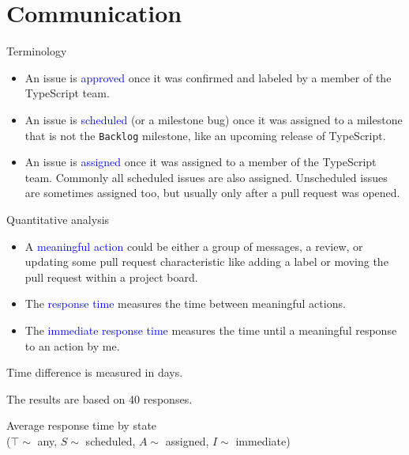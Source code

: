\documentclass{beamer}
\theoremstyle{definition}
\def\code#1{\texttt{\frenchspacing#1}}
\def\padding{\vspace{0.5cm}}
\def\b{\textcolor{blue}}
\begin{document}
\section{Communication}
\begin{frame}{Terminology}\pause
\begin{itemize}
    \item An issue is \b{approved} once it was confirmed and labeled by a member of the TypeScript team.\pause
    \item An issue is \b{scheduled} (or a milestone bug) once it was assigned to a milestone that is not the \code{Backlog} milestone, like an upcoming release of TypeScript.\pause
    \item An issue is \b{assigned} once it was assigned to a member of the TypeScript team. Commonly all scheduled issues are also assigned. Unscheduled issues are sometimes assigned too, but usually only after a pull request was opened.
\end{itemize}
\end{frame}
\begin{frame}{Quantitative analysis}\pause
\begin{itemize}
    \item A \b{meaningful action} could be either a group of messages, a review, or updating some pull request characteristic like adding a label or moving the pull request within a project board.\pause
    \item The \b{response time} measures the time between meaningful actions.\pause
    \item The \b{immediate response time} measures the time until a meaningful response to an action by me.
\end{itemize}\pause

\padding

Time difference is measured in days.\pause

The results are based on 40 responses.
\end{frame}
\begin{frame}{}
\centering
{}
\centering
Average response time by state \\ ($\top \sim$ any, $S \sim$ scheduled, $A \sim$ assigned, $I \sim$ immediate)
\end{frame}
\end{document}
